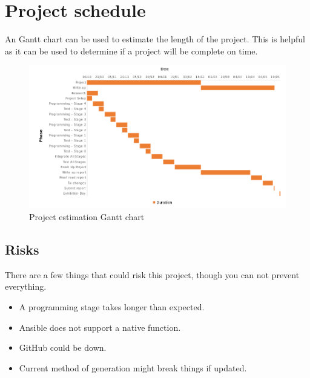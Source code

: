 \documentclass[12pt,a4paper]{report}
\begin{document}
\section{Project schedule}
An Gantt chart can be used to estimate the length of the project. This is helpful as it can be used to determine if a project will be complete on time. 
\begin{figure}[h]
\includegraphics[width=15cm]{schedule}
\caption{Project estimation Gantt chart}
\centering
\end{figure}

\subsection{Risks}
There are a few things that could risk this project, though you can not prevent everything.
\begin{itemize}
  \item{A programming stage takes longer than expected.}
  \item{Ansible does not support a native function.}
  \item{GitHub could be down.}
  \item{Current method of generation might break things if updated.}
\end{itemize}


\end{document}
